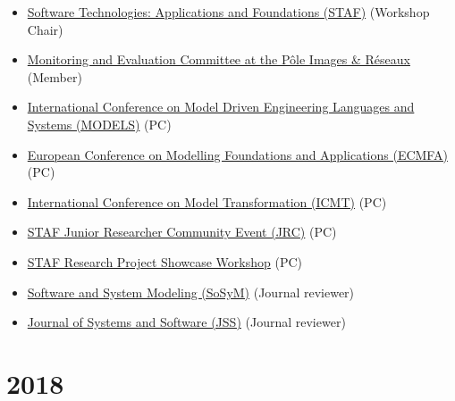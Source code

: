 \begin{itemize}
\tightlist
\item
  \href{https://staf2019.win.tue.nl/}{Software Technologies:
  Applications and Foundations (STAF)} (Workshop Chair)
\item
  \href{http://www.images-et-reseaux.com/en}{Monitoring and Evaluation
  Committee at the Pôle Images \& Réseaux} (Member)
\item
  \href{https://modelsconf19.org/}{International Conference on Model
  Driven Engineering Languages and Systems (MODELS)} (PC)
\item
  \href{https://staf2019.win.tue.nl/events/ecmfa19/}{European Conference
  on Modelling Foundations and Applications (ECMFA)} (PC)
\item
  \href{http://www.model-transformation.org/}{International Conference
  on Model Transformation (ICMT)} (PC)
\item
  \href{https://staf2019.win.tue.nl/events/staf-jrc19/}{STAF Junior
  Researcher Community Event (JRC)} (PC)
\item
  \href{https://staf2019.win.tue.nl/events/staf-rps19/}{STAF Research
  Project Showcase Workshop} (PC)
\item
  \href{http://www.sosym.org/}{Software and System Modeling (SoSyM)}
  (Journal reviewer)
\item
  \href{http://www.journals.elsevier.com/journal-of-systems-and-software}{Journal
  of Systems and Software (JSS)} (Journal reviewer)
\end{itemize}

\hypertarget{section-2}{%
\section{2018}\label{section-2}}

